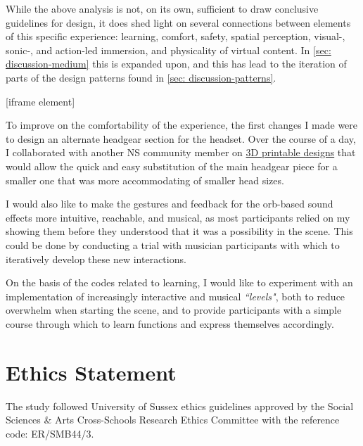 While the above analysis is not, on its own, sufficient to draw conclusive guidelines for design, it does shed light on several connections between elements of this specific experience: learning, comfort, safety, spatial perception, visual-, sonic-, and action-led immersion, and physicality of virtual content. In \autoref{sec: discussion-medium} this is expanded upon, and this has lead to the iteration of parts of the design patterns found in \autoref{sec: discussion-patterns}.

[iframe element]

To improve on the comfortability of the experience, the first changes I made were to design an alternate headgear section for the headset. Over the course of a day, I collaborated with another NS community member on \href{https://github.com/sambilbow/Deck-X/tree/main/Deck_X/STL_files/Headgear/Welding_Headgear_Adaptor}{3D printable designs} that would allow the quick and easy substitution of the main headgear piece for a smaller one that was more accommodating of smaller head sizes.

I would also like to make the gestures and feedback for the orb-based sound effects more intuitive, reachable, and musical, as most participants relied on my showing them before they understood that it was a possibility in the scene. This could be done by conducting a trial with musician participants with which to iteratively develop these new interactions. 

On the basis of the codes related to learning, I would like to experiment with an implementation of increasingly interactive and musical \textit{``levels"}, both to reduce overwhelm when starting the scene, and to provide participants with a simple course through which to learn functions and express themselves accordingly.

\section{Ethics Statement}\label{sec: polaris-ethics}
The study followed University of Sussex ethics guidelines approved by the Social Sciences \& Arts Cross-Schools Research Ethics Committee with the reference code: ER/SMB44/3.

